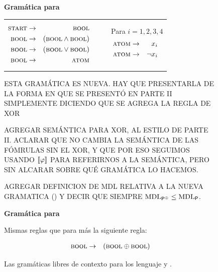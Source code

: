  \begin{figure}[h!]
\centering
\small
{\bf Gramática para \grambool}
\begin{tabular}{ccc}
\begin{minipage}[h]{0,4\textwidth}
\begin{eqnarray*}
\textsc{start} &\to&\textsc{bool}\\
\textsc{bool} &\to&(\textsc{bool} \wedge \textsc{bool}) \\
\textsc{bool} &\to&(\textsc{bool} \vee \textsc{bool}) \\
\textsc{bool} &\to&\textsc{atom}
\end{eqnarray*}
\end{minipage}
&
\ \quad
&
\begin{minipage}[h]{0,4\textwidth}
\ \qquad Para $i=1,2,3,4$
\begin{eqnarray*}
\textsc{atom} &\to& x_i \\
\textsc{atom} &\to&\lnot x_i 
\end{eqnarray*}
\end{minipage}
\end{tabular}

\bigskip


ESTA GRAMÁTICA ES NUEVA. HAY QUE PRESENTARLA DE LA FORMA EN QUE SE PRESENTÓ EN PARTE II SIMPLEMENTE DICIENDO QUE SE AGREGA LA REGLA DE XOR

AGREGAR SEMÁNTICA PARA XOR, AL ESTILO DE PARTE II. ACLARAR QUE NO CAMBIA LA SEMÁNTICA DE LAS FÓMRULAS SIN EL XOR, Y QUE POR ESO SEGUIMOS USANDO $\llbracket \varphi\rrbracket$ PARA REFERIRNOS A LA SEMÁNTICA, PERO SIN ALCARAR SOBRE QUÉ GRAMÁTICA LO HACEMOS.

AGREGAR DEFINICION DE MDL RELATIVA A LA NUEVA GRAMATICA (\mdlboolxor) Y DECIR QUE SIEMPRE ${\rm MDL}_{{\sf P}^\oplus}\leq {\rm MDL}_{{\sf P}}$.

{\bf Gramática para \gramboolxor}

Mismas reglas que para \grambool más la siguiente regla:

\begin{minipage}[h]{0,4\textwidth}
\begin{eqnarray*}
\textsc{bool} &\to&(\textsc{bool} \oplus \textsc{bool}) \\
\end{eqnarray*}
\end{minipage}

      \caption{Las gramáticas libres de contexto para los lenguaje \grambool y \gramboolxor.}
      \label{PCFG}
   \end{figure}


